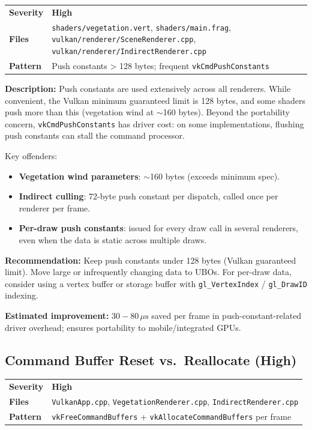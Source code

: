 \documentclass[a4paper,10pt]{article}
\newcommand{\us}{\ensuremath{\,\mu\text{s}}}
\newcommand{\severity}[1]{%
  \ifstrequal{#1}{Critical}{\textcolor{critical}{\textbf{#1}}}{%
  \ifstrequal{#1}{High}{\textcolor{high}{\textbf{#1}}}{%
  \ifstrequal{#1}{Medium}{\textcolor{medium}{\textbf{#1}}}{%
  \ifstrequal{#1}{Low}{\textcolor{low}{\textbf{#1}}}{#1}}}}}
\begin{document}
\begin{tabular}{ll}
\textbf{Severity} & \severity{High} \\
\textbf{Files}     & \texttt{shaders/vegetation.vert},
                      \texttt{shaders/main.frag},
                      \texttt{vulkan/renderer/SceneRenderer.cpp},
                      \texttt{vulkan/renderer/IndirectRenderer.cpp} \\
\textbf{Pattern}   & Push constants > 128 bytes; frequent \texttt{vkCmdPushConstants} \\
\end{tabular}

\vspace{0.5em}
\noindent
\textbf{Description:} Push constants are used extensively across all renderers.
While convenient, the Vulkan minimum guaranteed limit is 128 bytes, and some
shaders push more than this (vegetation wind at $\sim$160 bytes). Beyond the
portability concern, \texttt{vkCmdPushConstants} has driver cost: on some
implementations, flushing push constants can stall the command processor.

Key offenders:
\begin{itemize}[nosep]
    \item \textbf{Vegetation wind parameters}: $\sim$160 bytes (exceeds
          minimum spec).
    \item \textbf{Indirect culling}: 72-byte push constant per dispatch,
          called once per renderer per frame.
    \item \textbf{Per-draw push constants}: issued for every draw call in
          several renderers, even when the data is static across multiple draws.
\end{itemize}

\noindent\textbf{Recommendation:} Keep push constants under 128 bytes (Vulkan
guaranteed limit). Move large or infrequently changing data to UBOs. For
per-draw data, consider using a vertex buffer or storage buffer with
\texttt{gl\_VertexIndex} / \texttt{gl\_DrawID} indexing.

\noindent\textbf{Estimated improvement:} $30{-}80\us$ saved per frame in
push-constant-related driver overhead; ensures portability to mobile/integrated
GPUs.

\subsection{Command Buffer Reset vs.\ Reallocate (High)}

\begin{tabular}{ll}
\textbf{Severity} & \severity{High} \\
\textbf{Files}     & \texttt{VulkanApp.cpp}, \texttt{VegetationRenderer.cpp},
                      \texttt{IndirectRenderer.cpp} \\
\textbf{Pattern}   & \texttt{vkFreeCommandBuffers} + \texttt{vkAllocateCommandBuffers}
                      per frame \\
\end{tabular}
\end{document}

